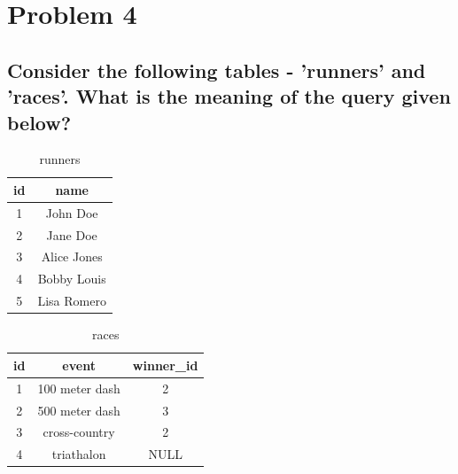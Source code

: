 \documentclass[12pt]{article}
\begin{document}
\newpage

\section{Problem 4}

\subsection{Consider the following tables - 'runners' and 'races'. What is the meaning of the query given below? }


\begin{table}[!hbt]
    \centering
    \begin{tabular}{|c|c|} 
        \hline
        \textbf{id} & \textbf{name} \\ 
        \hline\hline
        1 & John Doe \\ 
        \hline
        2 & Jane Doe \\
        \hline
        3 & Alice Jones \\
        \hline
        4 & Bobby Louis \\
        \hline
        5 & Lisa Romero \\ 
        \hline
    \end{tabular}
    \caption{runners}
    \label{tab:my_label}
\end{table}

\begin{table}[!hbt]
    \centering
    \begin{tabular}{|c|c|c|} 
        \hline
        \textbf{id} & \textbf{event} & \textbf{winner\_id}\\ 
        \hline\hline
        1 & 100 meter dash & 2 \\ 
        \hline
        2 & 500 meter dash & 3\\
        \hline
        3 & cross-country & 2 \\
        \hline
        4 & triathalon & NULL \\ 
        \hline
    \end{tabular}
    \caption{races}
    \label{tab:my_label}
\end{table}
\end{document}
